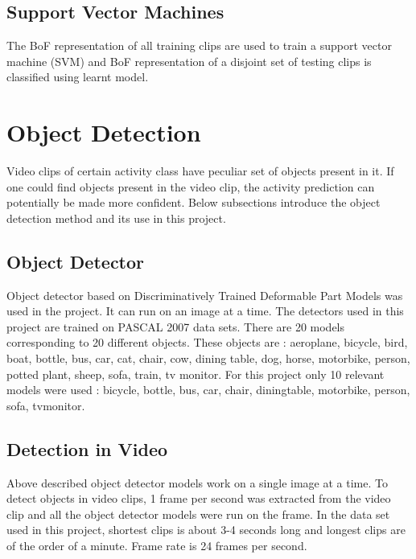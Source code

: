 \subsection{Support Vector Machines}
\label{AP_definition}
The BoF representation of all training clips are used to train a
support vector machine (SVM) and BoF representation of a disjoint set of testing clips is classified using
learnt model. 

\section{Object Detection}

\label{section_OBJ}


Video clips of certain activity class have peculiar set of objects present in it.
If one could find objects present in the video clip, the activity prediction can 
potentially be made more confident. Below subsections introduce the object detection
method and its use in this project.

\subsection{Object Detector}
\label{section_OBJDET}
Object detector based on Discriminatively Trained Deformable Part Models \cite{voc-release4} was used in
the project. It can run on an image at a time. The detectors used in this project are trained on PASCAL 2007 data sets.
There are 20 models corresponding to 20 different objects.
These objects are : aeroplane, bicycle,
bird, boat, bottle, bus, car, cat, chair, cow, dining table, dog, horse,
motorbike, person, potted plant, sheep, sofa, train, tv monitor.
For this project only 10 relevant models were used : bicycle, bottle, bus, car,
chair, diningtable, motorbike, person, sofa, tvmonitor.

\subsection{Detection in Video}
Above described object detector models work on a single image at a time. To detect objects in video clips, 1 frame per second was extracted from the video clip and all the object detector models were run on the frame. In the data set used in this project, shortest clips is about 3-4 seconds long and longest clips are of the order of a minute. Frame rate is 24 frames per second.

